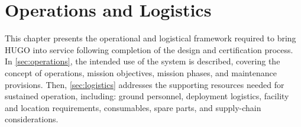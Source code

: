 \chapter{Operations and Logistics}
\label{ch:operations_logistics}


This chapter presents the operational and logistical framework required to bring HUGO into service following completion of the design and certification process. In \autoref{sec:operations}, the intended use of the system is described, covering the concept of operations, mission objectives, mission phases, and maintenance provisions. Then, \autoref{sec:logistics} addresses the supporting resources needed for sustained operation, including: ground personnel, deployment logistics, facility and location requirements, consumables, spare parts, and supply-chain considerations.


